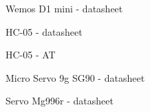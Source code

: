 \documentclass[11pt,titlepage,a4paper]{article}
\begin{document}
\newpage

\begin{figure}[p]
    \caption{Wemos D1 mini - datasheet}
    \label{wemos}
\end{figure}

\clearpage



\newpage

\begin{figure}[p]
    \caption{HC-05 - datasheet}
    \label{HC05data}
\end{figure}

\clearpage



\newpage

\begin{figure}[p]
    \caption{HC-05 - AT}
    \label{HC05at}
\end{figure}

\clearpage



\newpage

\begin{figure}[p]
    \caption{Micro Servo 9g SG90 - datasheet}
    \label{ServoSG90}
\end{figure}

\clearpage



\newpage

\begin{figure}[p]
    \caption{Servo Mg996r - datasheet}
    \label{ServoMg996r}
\end{figure}

\clearpage


\end{document}
